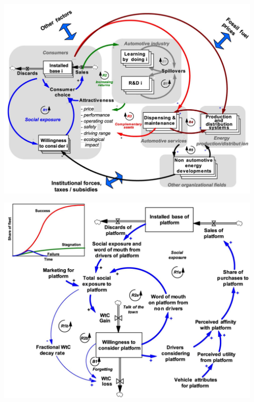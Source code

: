 \documentclass{beamer}
\begin{document}
\begin{frame}
  \includegraphics[height=\textheight]{Sterman-fig-2.jpg}
\end{frame}
    
\begin{frame}
  \includegraphics[height=\textheight]{Sterman-fig-3.jpg}
\end{frame}
\end{document}
